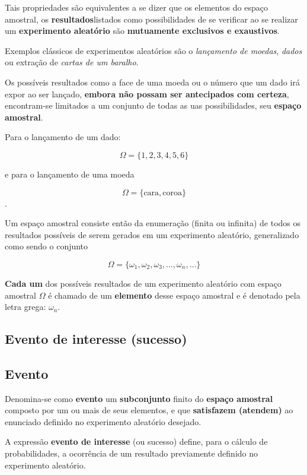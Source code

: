 \documentclass[
]{book}
\begin{document}
Tais propriedades são equivalentes a se dizer que os elementos do espaço amostral, os \textbf{resultados}listados como possibilidades de se verificar ao se realizar um \textbf{experimento aleatório} são \textbf{mutuamente exclusivos e exaustivos}.

Exemplos clássicos de experimentos aleatórios são o \emph{lançamento de moedas}, \emph{dados} ou extração de \emph{cartas de um baralho}.

Os possíveis resultados como a face de uma moeda ou o número que um dado irá expor ao ser lançado, \textbf{embora não possam ser antecipados com certeza}, encontram-se limitados a um conjunto de todas as uas possibilidades, seu \textbf{espaço amostral}.

Para o lançamento de um dado:

\[
\Omega = \{ 1,2,3,4,5,6\}
\]

e para o lançamento de uma moeda

\[\Omega=\{\text{cara}, \text{coroa}\}
\].

Um espaço amostral consiste então da enumeração (finita ou infinita) de todos os resultados possíveis de serem gerados em um experimento aleatório, generalizado como sendo o conjunto

\[
\Omega = \{\omega_{1}, \omega_{2}, \omega_{3}, ..., \omega_{n}, \dots \}
\]

\textbf{Cada um} dos possíveis resultados de um experimento aleatório com espaço amostral \(\Omega\) é chamado de um \textbf{elemento} desse espaço amostral e é denotado pela letra grega: \(\omega_{n}\).

\hypertarget{evento-de-interesse-sucesso}{%
\subsection{Evento de interesse (sucesso)}\label{evento-de-interesse-sucesso}}

\hypertarget{evento}{%
\subsection{Evento}\label{evento}}

Denomina-se como \textbf{evento} um \textbf{subconjunto} finito do \textbf{espaço amostral} composto por um ou mais de seus elementos, e que \textbf{satisfazem (atendem)} ao enunciado definido no experimento aleatório desejado.

A expressão \textbf{evento de interesse} (ou sucesso) define, para o cálculo de probabilidades, a ocorrência de um resultado previamente definido no experimento aleatório.
\end{document}
